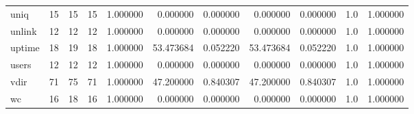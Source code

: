 \begin{longtable}{lrrrrrrrrrr}
uniq      &                                      15 &                 15 &                                15 &                                   1.000000 &                               0.000000 &                                     0.000000 &                          0.000000 &                                0.000000 &                                1.0 &                                           1.000000 \\
unlink    &                                      12 &                 12 &                                12 &                                   1.000000 &                               0.000000 &                                     0.000000 &                          0.000000 &                                0.000000 &                                1.0 &                                           1.000000 \\
uptime    &                                      18 &                 19 &                                18 &                                   1.000000 &                              53.473684 &                                     0.052220 &                         53.473684 &                                0.052220 &                                1.0 &                                           1.000000 \\
users     &                                      12 &                 12 &                                12 &                                   1.000000 &                               0.000000 &                                     0.000000 &                          0.000000 &                                0.000000 &                                1.0 &                                           1.000000 \\
vdir      &                                      71 &                 75 &                                71 &                                   1.000000 &                              47.200000 &                                     0.840307 &                         47.200000 &                                0.840307 &                                1.0 &                                           1.000000 \\
wc        &                                      16 &                 18 &                                16 &                                   1.000000 &                               0.000000 &                                     0.000000 &                          0.000000 &                                0.000000 &                                1.0 &                                           1.000000 \\

\end{longtable}
